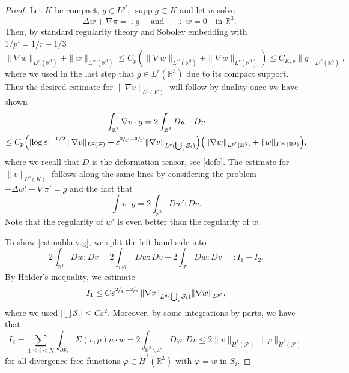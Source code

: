 \documentclass[10pt]{amsart}
\newcommand{\R}{\mathbb{R}}
\let\eps\varepsilon
\newcommand{\cS}{\mathcal{S}}
\DeclareMathOperator{\supp}{supp}
\theoremstyle{definition}
\theoremstyle{remark}
\let\oldbigcup\bigcup
\begin{document}
\begin{proof}

Let $K$ be compact, $g \in L^{p'}$, $\supp g \subset K$ and let $w$ solve
\begin{equation*}
- \Delta w + \nabla \pi = \div g \quad \text{ and } \quad \div w = 0 \quad \text{in } \R^3.
\end{equation*}
Then, by standard regularity theory and Sobolev embedding with $1/{p'} = 1/r - 1/3$
\begin{equation}
\|\nabla w\|_{L^{p'}(\R^3)} + \|w\|_{L^\infty(\R^3)} \leq C_p (\|\nabla w\|_{L^{p'}(\R^3)} + \|\nabla w\|_{L^{r}(\R^3)}) \leq C_{K,p}\|g\|_{L^{p'}(\R^3)},
\end{equation}
where we used in the last step that $g \in L^r(\R^3)$ due to its compact support.
Thus the desired estimate for $\|\nabla v\|_{L^p(K)}$ will follow by duality once we have shown
\begin{multline} \label{est:nabla.v.g}
\int_{\R^3} \nabla v \cdot g
= 2 \int_{\R^3} D w : D v \\
\leq C_p \Bigl(\left|\log \eps\right|^{-1/2} \|\nabla v\|_{L^2(\mathcal F)} + {\eps^{\sfrac 2 {q'} - \sfrac{2}{p'}} \|\nabla v\|_{L^q(\oldbigcup_i \cS_i)}}\Bigr)
\Bigl(\|\nabla w\|_{L^{p'}(\R^3)} + \|w\|_{L^\infty(\R^3)} \Bigr),
\end{multline}
where we recall that $D$ is the deformation tensor, see \eqref{defo}.
The estimate for $\|v\|_{L^p(K)}$ follows along the same lines by considering the problem $- \Delta w' + \nabla \pi' = g$ and the fact that
\begin{equation*}
\int v \cdot g = 2 \int_{\R^3} D w' : D v.
\end{equation*}
Note that the regularity of $w'$ is even better than the regularity of $w$.

To show \eqref{est:nabla.v.g}, we split the left hand side into
\begin{equation}
2 \int_{\R^3} D w : D v = 2 \int_{\cup \mathcal S_i} D w : D v + 2 \int_{\mathcal F} D w : D v =:I_1 + I_2.
\end{equation}
By Hölder's inequality, we estimate
\begin{equation}
I_1 \leq C {\eps^{\sfrac 2 {q'} - \sfrac{2}{p'}} \|\nabla v\|_{L^q(\oldbigcup_i \cS_i)}} \|\nabla w\|_{L^{p'}},
\end{equation}
where we used $|\bigcup \mathcal S_i| \leq C \eps^2$.
Moreover, by some integrations by parts, we have that
\begin{equation}
I_2 = \sum_{1 \leq i \leq N} \int_{\partial \mathcal S_i} \Sigma(v,p) n \cdot w = 2 \int_{\R^3 \smallsetminus \mathcal F} D \varphi : D v
\leq 2 \|v\|_{\dot H^1(\mathcal F)} \|\varphi\|_{\dot H^1(\mathcal F)}
\end{equation}
for all divergence-free functions $\varphi \in \dot H^1(\R^3)$ with $\varphi = w$ in $S_i$.


\end{proof}
\end{document}
